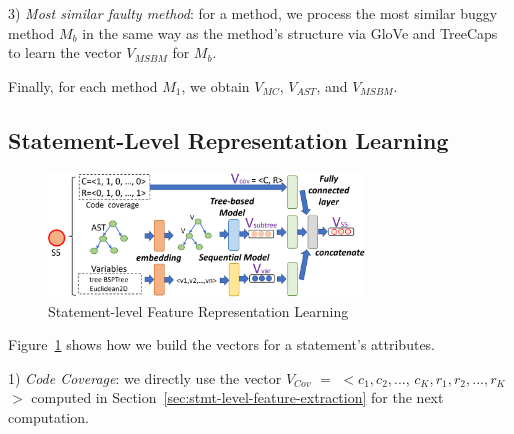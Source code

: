 
3) {\em Most similar faulty method}: for a method, we
process the most similar buggy method $M_b$ 
in the same way as the method's structure via GloVe and TreeCaps to
learn the vector $V_{MSBM}$ for $M_b$.

Finally, for each method $M_1$, we obtain $V_{MC}$, $V_{AST}$, and
$V_{MSBM}$.


\subsection{Statement-Level Representation Learning}

\begin{figure}[t]
	\centering
	\includegraphics[width=3.3in]{graphs/step-2-statement-new-2.png}
        \vspace{-9pt}
	\caption{Statement-level Feature Representation Learning}
	\label{statement-level-feature-learning}
\end{figure}

Figure~\ref{statement-level-feature-learning} shows how we build the
vectors for a statement's attributes.

1) {\em Code Coverage}: we directly use the vector
$V_{Cov}$ $=$ $<$$c_1, c_2, ...$, $c_K, r_1, r_2, ..., r_K$$>$ computed in
Section~\ref{sec:stmt-level-feature-extraction} for the next
computation.

